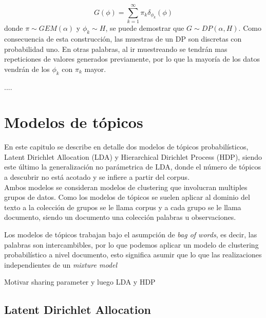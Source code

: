 \documentclass[letterpaper,12pt,oneside]{book} %
\begin{document}
\begin{equation}
    G(\phi) = \sum_{k=1}^{\infty}\pi_{k}\delta_{\phi_{k}}(\phi)
\end{equation}
donde $\pi \sim GEM(\alpha)$ y $\phi_{k} \sim H$, se puede demostrar que $G \sim DP(\alpha, H)$. Como consecuencia de esta construcción, las muestras de un DP son discretas con probabilidad uno. En otras palabras, al ir muestreando se tendrán mas repeticiones de valores generados previamente, por lo que la mayoría de los datos vendrán de los $\phi_{k}$ con $\pi_{k}$ mayor.

....


\section{Modelos de tópicos}

En este capitulo se describe en detalle dos modelos de tópicos probabilísticos,  Latent Dirichlet Allocation (LDA) y Hierarchical Dirichlet Process (HDP), siendo este último la generalización no parámetrica de LDA, donde el número de tópicos a descubrir no está acotado y se infiere a partir del corpus.\\

Ambos modelos se consideran modelos de clustering que involucran multiples grupos de datos. Como los modelos de tópicos se suelen aplicar al dominio del texto a la colección de grupos se le llama corpus y a cada grupo se le llama documento, siendo un documento una colección palabras u observaciones. 

Los modelos de tópicos trabajan bajo el asumpción de \textit{bag of words}, es decir, las palabras son intercambibles, por lo que podemos aplicar un modelo de clustering probabilístico a nivel documento, esto significa asumir que lo que las realizaciones independientes de un \textit{mixture model}

Motivar sharing parameter y luego LDA y HDP

\subsection{Latent Dirichlet Allocation}

\end{document}
